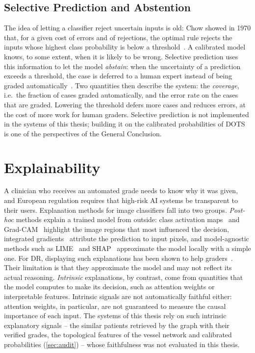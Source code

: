 \subsection{Selective Prediction and Abstention}

The idea of letting a classifier reject uncertain inputs is old: Chow showed in 1970
that, for a given cost of errors and of rejections, the optimal rule rejects the inputs
whose highest class probability is below a threshold~\cite{chow1970reject}. A calibrated model knows, to some extent, when it is likely to be wrong. Selective
prediction uses this information to let the model \emph{abstain}: when the uncertainty of a
prediction exceeds a threshold, the case is deferred to a human expert instead of being
graded automatically~\cite{geifman2017selective}. Two quantities then describe the system:
the \emph{coverage}, i.e.\ the fraction of cases graded automatically, and the error rate on
the cases that are graded. Lowering the threshold defers more cases and reduces errors, at
the cost of more work for human graders. Selective prediction is not implemented in the
systems of this thesis; building it on the calibrated probabilities of DOTS is one of the
perspectives of the General Conclusion.

\section{Explainability}
\label{sec:xai}

A clinician who receives an automated grade needs to know why it was given, and European
regulation requires that high-risk AI systems be transparent to their users. Explanation
methods for image classifiers fall into two groups. \emph{Post-hoc} methods explain a
trained model from outside: class activation maps~\cite{zhou2016cam} and
Grad-CAM~\cite{selvaraju2017gradcam} highlight the image regions that most influenced the
decision, integrated gradients~\cite{sundararajan2017ig} attribute the prediction to input
pixels, and model-agnostic methods such as LIME~\cite{ribeiro2016lime} and
SHAP~\cite{lundberg2017shap} approximate the model locally with a simple one. For DR,
displaying such explanations has been shown to help graders~\cite{sayres2019integrated}.
Their limitation is that they approximate the model and may not reflect its actual
reasoning. \emph{Intrinsic} explanations, by contrast, come from quantities that the model
computes to make its decision, such as attention weights or interpretable features.
Intrinsic signals are not automatically faithful either: attention weights, in
particular, are not guaranteed to measure the causal importance of each input. The
systems of this thesis rely on such intrinsic explanatory signals -- the similar
patients retrieved by the graph with their verified grades, the topological features of
the vessel network and calibrated probabilities (\cref{sec:audit}) -- whose faithfulness was
not evaluated in this thesis.

